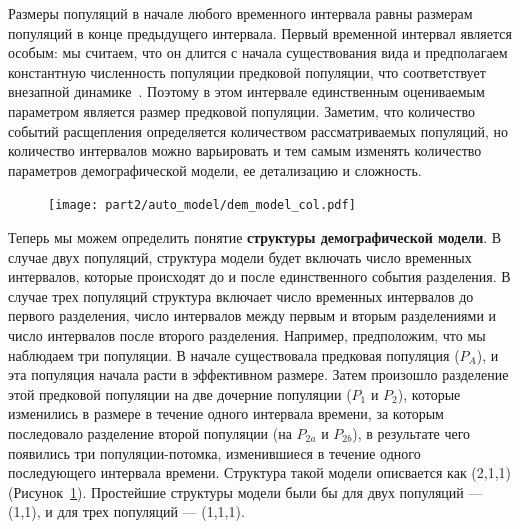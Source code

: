 Размеры популяций в начале любого временного интервала равны размерам популяций в конце предыдущего интервала.
Первый временной интервал является особым: мы считаем, что он длится с начала существования вида и предполагаем константную численность популяции предковой популяции, что соответствует внезапной динамике~\cite{gutenkunst2009inferring}.
Поэтому в этом интервале единственным оцениваемым параметром является размер предковой популяции.
Заметим, что количество событий расщепления определяется количеством рассматриваемых популяций, но количество интервалов можно варьировать и тем самым изменять количество параметров демографической модели, ее детализацию и сложность. 


\begin{figure}[bt!]
  \centering
  \texttt{[image: part2/auto\_model/dem\_model\_col.pdf]}
  \label{fig:exaple_of_model_plot}
\end{figure}

Теперь мы можем определить понятие \textbf{структуры демографической модели}.
В случае двух популяций, структура модели будет включать число временных интервалов, которые происходят до и после единственного события разделения. В случае трех популяций структура включает число временных интервалов до первого разделения, число интервалов между первым и вторым разделениями и число интервалов после второго разделения.
Например, предположим, что мы наблюдаем три популяции.
В начале существовала предковая популяция ($P_A$), и эта популяция начала расти в эффективном размере.
Затем произошло разделение этой предковой популяции на две дочерние популяции ($P_1$ и $P_2$), которые изменились в  размере в течение одного интервала времени, за которым последовало разделение второй популяции (на $P_{2a}$ и $P_{2b}$), в результате чего появились три популяции-потомка, изменившиеся в течение одного последующего интервала времени. 
Структура такой модели описвается как (2,1,1) (Рисунок~\ref{fig:exaple_of_model_plot}).
Простейшие структуры модели были бы для двух популяций --- (1,1), и для трех популяций --- (1,1,1).

